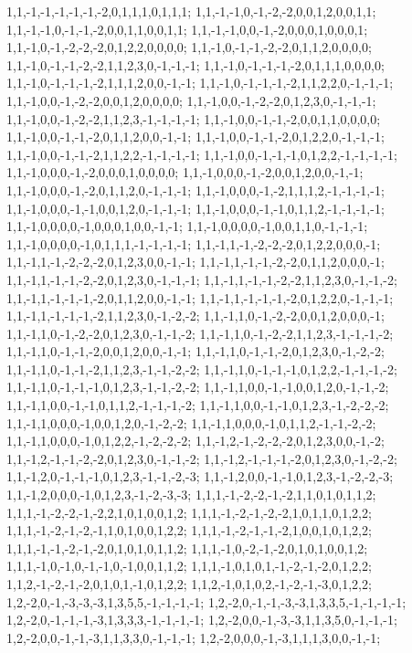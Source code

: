 {{1,1,-1,-1,-1,-1,-1,-2,0,1,1,1,0,1,1,1; 1,1,-1,-1,0,-1,-2,-2,0,0,1,2,0,0,1,1; 1,1,-1,-1,0,-1,-1,-2,0,0,1,1,0,0,1,1; 1,1,-1,-1,0,0,-1,-2,0,0,0,1,0,0,0,1; 1,1,-1,0,-1,-2,-2,-2,0,1,2,2,0,0,0,0; 1,1,-1,0,-1,-1,-2,-2,0,1,1,2,0,0,0,0; 1,1,-1,0,-1,-1,-2,-2,1,1,2,3,0,-1,-1,-1; 1,1,-1,0,-1,-1,-1,-2,0,1,1,1,0,0,0,0; 1,1,-1,0,-1,-1,-1,-2,1,1,1,2,0,0,-1,-1; 1,1,-1,0,-1,-1,-1,-2,1,1,2,2,0,-1,-1,-1; 1,1,-1,0,0,-1,-2,-2,0,0,1,2,0,0,0,0; 1,1,-1,0,0,-1,-2,-2,0,1,2,3,0,-1,-1,-1;
1,1,-1,0,0,-1,-2,-2,1,1,2,3,-1,-1,-1,-1; 1,1,-1,0,0,-1,-1,-2,0,0,1,1,0,0,0,0; 1,1,-1,0,0,-1,-1,-2,0,1,1,2,0,0,-1,-1; 1,1,-1,0,0,-1,-1,-2,0,1,2,2,0,-1,-1,-1; 1,1,-1,0,0,-1,-1,-2,1,1,2,2,-1,-1,-1,-1; 1,1,-1,0,0,-1,-1,-1,0,1,2,2,-1,-1,-1,-1; 1,1,-1,0,0,0,-1,-2,0,0,0,1,0,0,0,0; 1,1,-1,0,0,0,-1,-2,0,0,1,2,0,0,-1,-1; 1,1,-1,0,0,0,-1,-2,0,1,1,2,0,-1,-1,-1; 1,1,-1,0,0,0,-1,-2,1,1,1,2,-1,-1,-1,-1; 1,1,-1,0,0,0,-1,-1,0,0,1,2,0,-1,-1,-1; 1,1,-1,0,0,0,-1,-1,0,1,1,2,-1,-1,-1,-1;
1,1,-1,0,0,0,0,-1,0,0,0,1,0,0,-1,-1; 1,1,-1,0,0,0,0,-1,0,0,1,1,0,-1,-1,-1; 1,1,-1,0,0,0,0,-1,0,1,1,1,-1,-1,-1,-1; 1,1,-1,1,-1,-2,-2,-2,0,1,2,2,0,0,0,-1; 1,1,-1,1,-1,-2,-2,-2,0,1,2,3,0,0,-1,-1; 1,1,-1,1,-1,-1,-2,-2,0,1,1,2,0,0,0,-1; 1,1,-1,1,-1,-1,-2,-2,0,1,2,3,0,-1,-1,-1; 1,1,-1,1,-1,-1,-2,-2,1,1,2,3,0,-1,-1,-2; 1,1,-1,1,-1,-1,-1,-2,0,1,1,2,0,0,-1,-1; 1,1,-1,1,-1,-1,-1,-2,0,1,2,2,0,-1,-1,-1; 1,1,-1,1,-1,-1,-1,-2,1,1,2,3,0,-1,-2,-2; 1,1,-1,1,0,-1,-2,-2,0,0,1,2,0,0,0,-1;
1,1,-1,1,0,-1,-2,-2,0,1,2,3,0,-1,-1,-2; 1,1,-1,1,0,-1,-2,-2,1,1,2,3,-1,-1,-1,-2; 1,1,-1,1,0,-1,-1,-2,0,0,1,2,0,0,-1,-1; 1,1,-1,1,0,-1,-1,-2,0,1,2,3,0,-1,-2,-2; 1,1,-1,1,0,-1,-1,-2,1,1,2,3,-1,-1,-2,-2; 1,1,-1,1,0,-1,-1,-1,0,1,2,2,-1,-1,-1,-2; 1,1,-1,1,0,-1,-1,-1,0,1,2,3,-1,-1,-2,-2; 1,1,-1,1,0,0,-1,-1,0,0,1,2,0,-1,-1,-2; 1,1,-1,1,0,0,-1,-1,0,1,1,2,-1,-1,-1,-2; 1,1,-1,1,0,0,-1,-1,0,1,2,3,-1,-2,-2,-2; 1,1,-1,1,0,0,0,-1,0,0,1,2,0,-1,-2,-2; 1,1,-1,1,0,0,0,-1,0,1,1,2,-1,-1,-2,-2;
1,1,-1,1,0,0,0,-1,0,1,2,2,-1,-2,-2,-2; 1,1,-1,2,-1,-2,-2,-2,0,1,2,3,0,0,-1,-2; 1,1,-1,2,-1,-1,-2,-2,0,1,2,3,0,-1,-1,-2; 1,1,-1,2,-1,-1,-1,-2,0,1,2,3,0,-1,-2,-2; 1,1,-1,2,0,-1,-1,-1,0,1,2,3,-1,-1,-2,-3; 1,1,-1,2,0,0,-1,-1,0,1,2,3,-1,-2,-2,-3; 1,1,-1,2,0,0,0,-1,0,1,2,3,-1,-2,-3,-3; 1,1,1,-1,-2,-2,-1,-2,1,1,0,1,0,1,1,2; 1,1,1,-1,-2,-2,-1,-2,2,1,0,1,0,0,1,2; 1,1,1,-1,-2,-1,-2,-2,1,0,1,1,0,1,2,2; 1,1,1,-1,-2,-1,-2,-1,1,0,1,0,0,1,2,2; 1,1,1,-1,-2,-1,-1,-2,1,0,0,1,0,1,2,2;
1,1,1,-1,-1,-2,-1,-2,0,1,0,1,0,1,1,2; 1,1,1,-1,0,-2,-1,-2,0,1,0,1,0,0,1,2; 1,1,1,-1,0,-1,0,-1,-1,0,-1,0,0,1,1,2; 1,1,1,-1,0,1,0,1,-1,-2,-1,-2,0,1,2,2; 1,1,2,-1,-2,-1,-2,0,1,0,1,-1,0,1,2,2; 1,1,2,-1,0,1,0,2,-1,-2,-1,-3,0,1,2,2; 1,2,-2,0,-1,-3,-3,-3,1,3,5,5,-1,-1,-1,-1; 1,2,-2,0,-1,-1,-3,-3,1,3,3,5,-1,-1,-1,-1; 1,2,-2,0,-1,-1,-1,-3,1,3,3,3,-1,-1,-1,-1; 1,2,-2,0,0,-1,-3,-3,1,1,3,5,0,-1,-1,-1; 1,2,-2,0,0,-1,-1,-3,1,1,3,3,0,-1,-1,-1; 1,2,-2,0,0,0,-1,-3,1,1,1,3,0,0,-1,-1;
}}
